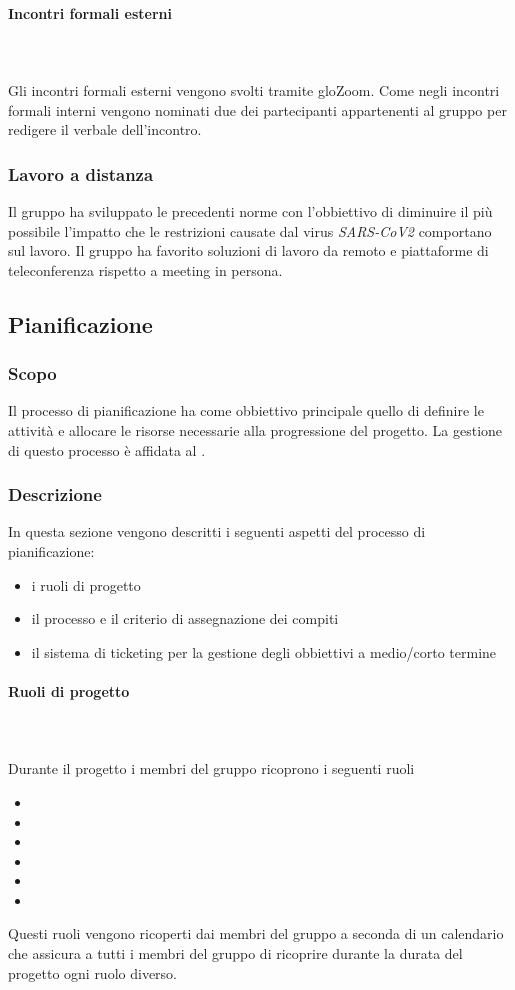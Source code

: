 \paragraph{Incontri formali esterni}\mbox{}\\
\mbox{}\\
Gli incontri formali esterni vengono svolti tramite glo{Zoom}. Come negli incontri formali interni vengono nominati due dei partecipanti appartenenti al gruppo per redigere il verbale dell'incontro. 

\subsubsection{Lavoro a distanza}
Il gruppo ha sviluppato le precedenti norme con l'obbiettivo di diminuire il più possibile l'impatto che le restrizioni causate dal virus \textit{SARS-CoV2} comportano sul lavoro. Il gruppo ha favorito soluzioni di lavoro da remoto e piattaforme di teleconferenza rispetto a meeting in persona.

\subsection{Pianificazione}
\subsubsection{Scopo}
Il processo di pianificazione ha come obbiettivo principale quello di definire le attività e allocare le risorse necessarie alla progressione del progetto. La gestione di questo processo è affidata al \RdP{}.
\subsubsection{Descrizione}
In questa sezione vengono descritti i seguenti aspetti del processo di pianificazione:
\begin{itemize}
\item i ruoli di progetto
\item il processo e il criterio di assegnazione dei compiti
\item il sistema di ticketing per la gestione degli obbiettivi a medio/corto termine
\end{itemize} 
\paragraph{Ruoli di progetto}\mbox{}\\
\mbox{}\\
Durante il progetto i membri del gruppo ricoprono i seguenti ruoli
\begin{itemize}
\item \RdP{}
\item \adm{}
\item \ana{}
\item \prog{}
\item \progr{}
\item \ver{}
\end{itemize}
Questi ruoli vengono ricoperti dai membri del gruppo a seconda di un calendario che assicura a tutti i membri del gruppo di ricoprire durante la durata del progetto ogni ruolo diverso.


